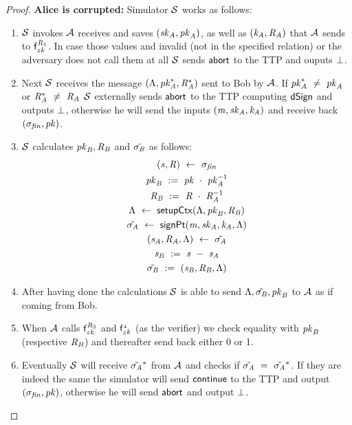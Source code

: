 \begin{proof}
    \textbf{Alice is corrupted: } Simulator $\mathcal{S}$ works as follows:
    \begin{enumerate}
        \item $\mathcal{S}$ invokes $\mathcal{A}$ receives and saves $(\mathit{sk}_{\mathit{A}}, \mathit{pk}_{\mathit{A}})$, as well as $(\mathit{\mathit{k}_{\mathit{A}}}, \mathit{R}_{\mathit{A}})$ that $\mathcal{A}$ sends to $\mathsf{f}^{\mathit{R}_1}_{zk}$.
        In case those values and invalid (not in the specified relation) or the adversary does not call them at all $\mathcal{S}$ sends $\mathsf{abort}$ to the TTP and ouputs $\bot$.
        \item Next $\mathcal{S}$ receives the message $(\Lambda, \mathit{pk}_{\mathit{A}}^*, \mathit{R}_{\mathit{A}}^*)$ sent to Bob by $\mathcal{A}$.
        If $\mathit{pk}_{\mathit{A}}^* ~\neq~ \mathit{pk}_{\mathit{A}}$ or $\mathit{R}_{\mathit{A}}^* ~\neq~ \mathit{R}_{\mathit{A}}$ $\mathcal{S}$ externally sends $\mathsf{abort}$ to the TTP computing $\mathsf{dSign}$ and outputs $\bot$, otherwise he will send the inputs $(\mathit{m}, \mathit{sk}_{\mathit{A}}, \mathit{\mathit{k}_{\mathit{A}}})$ and receive back $(\sigma_{\mathit{fin}}, \mathit{pk})$.
        \item $\mathcal{S}$ calculates $\mathit{pk}_{\mathit{B}}, \mathit{R}_{\mathit{B}}$ and $\tilde{\sigma_{\mathit{B}}}$ as follows:
        \begin{gather*}
            (\mathit{s}, \mathit{R}) ~\leftarrow~ \sigma_{\mathit{fin}} \\
            \mathit{pk}_{\mathit{B}} ~:=~ \mathit{pk} ~\cdot~ \mathit{pk}_{\mathit{A}}^{-1} \\
            \mathit{R}_{\mathit{B}} ~:=~ \mathit{R} ~\cdot~ \mathit{R}_{\mathit{A}}^{-1} \\
            \Lambda ~\leftarrow~ \mathsf{setupCtx}( \Lambda, \mathit{pk}_{\mathit{B}}, \mathit{R}_{\mathit{B}} ) \\
            \tilde{\sigma_{\mathit{A}}} ~\leftarrow~ \mathsf{signPt}(\mathit{m}, \mathit{sk}_{\mathit{A}}, \mathit{\mathit{k}_{\mathit{A}}}, \Lambda) \\
            (\mathit{s}_{\mathit{A}}, \mathit{R}_{\mathit{A}}, \Lambda) ~\leftarrow~ \tilde{\sigma_{\mathit{A}}} \\
            \mathit{s}_{\mathit{B}} ~:=~ \mathit{s} ~-~ \mathit{s}_{\mathit{A}} \\
            \tilde{\sigma_{\mathit{B}}} ~:=~ (\mathit{s}_{\mathit{B}}, \mathit{R}_{\mathit{B}}, \Lambda)
        \end{gather*}
        \item After having done the calculations $\mathcal{S}$ is able to send $\Lambda, \tilde{\sigma_{\mathit{B}}}, \mathit{pk}_{\mathit{B}}$ to $\mathcal{A}$ as if coming from Bob.
        \item When $\mathcal{A}$ calls $\mathsf{f}^{\mathit{R}_3}_{zk}$ and $\mathsf{f}^{_4}_{zk}$ (as the verifier) we check equality with $\mathit{pk}_{\mathit{B}}$ (respective $\mathit{R}_{\mathit{B}}$) and thereafter send back either 0 or 1.
        \item Eventually $\mathcal{S}$ will receive $\tilde{\sigma_{\mathit{A}}}^*$ from $\mathcal{A}$ and checks if $\tilde{\sigma_{\mathit{A}}} ~=~ \tilde{\sigma_{\mathit{A}}}^*$.
        If they are indeed the same the simulator will send $\mathsf{continue}$ to the TTP and output $(\sigma_{\mathit{fin}}, \mathit{pk})$, otherwise he will send $\mathsf{abort}$ and output $\bot$.
    \end{enumerate}


\end{proof}
